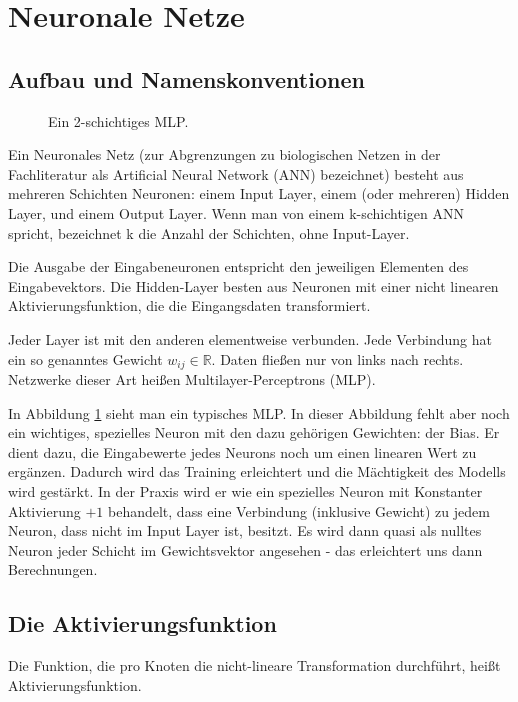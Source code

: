 \section{Neuronale Netze} %

\subsection{Aufbau und Namenskonventionen}
\begin{figure}[ht!]
\label{fig:MLP}
  \centering
    
  \caption{Ein 2-schichtiges MLP.}
\end{figure}


Ein Neuronales Netz (zur Abgrenzungen zu biologischen Netzen in der Fachliteratur als Artificial Neural Network (ANN) bezeichnet) besteht aus mehreren Schichten Neuronen: einem Input Layer, einem (oder mehreren) Hidden Layer, und einem Output Layer. 
Wenn man von einem k-schichtigen ANN spricht, bezeichnet k die Anzahl der Schichten, ohne Input-Layer.

Die Ausgabe der Eingabeneuronen entspricht den jeweiligen Elementen des Eingabevektors.
Die Hidden-Layer besten aus Neuronen mit einer nicht linearen Aktivierungsfunktion, die die Eingangsdaten transformiert.

Jeder Layer ist mit den anderen elementweise verbunden. Jede Verbindung hat ein so genanntes Gewicht $w_{ij} \in \mathbb{R}$. Daten fließen nur von links nach rechts. Netzwerke dieser Art heißen Multilayer-Perceptrons (MLP). 

In Abbildung \ref{fig:MLP} sieht man ein typisches MLP. In dieser Abbildung fehlt aber noch ein wichtiges, spezielles Neuron mit den dazu gehörigen Gewichten: der Bias. Er dient dazu, die Eingabewerte jedes Neurons noch um einen linearen Wert zu ergänzen. Dadurch wird das Training erleichtert und die Mächtigkeit des Modells wird gestärkt. In der Praxis wird er wie ein spezielles Neuron mit Konstanter Aktivierung $+1$ behandelt, dass eine Verbindung (inklusive Gewicht) zu jedem Neuron, dass nicht im Input Layer ist, besitzt. Es wird dann quasi als nulltes Neuron jeder Schicht im Gewichtsvektor angesehen - das erleichtert uns dann Berechnungen.
 

\subsection{Die Aktivierungsfunktion}

Die Funktion, die pro Knoten die nicht-lineare Transformation durchführt, heißt Aktivierungsfunktion. 

